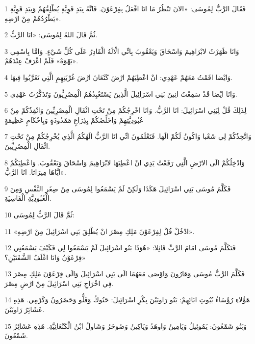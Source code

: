 \par 1 فَقَالَ الرَّبُّ لِمُوسَى: «الانَ تَنْظُرُ مَا انَا افْعَلُ بِفِرْعَوْنَ. فَانَّهُ بِيَدٍ قَوِيَّةٍ يُطْلِقُهُمْ وَبِيَدٍ قَوِيَّةٍ يَطْرُدُهُمْ مِنْ ارْضِهِ».
\par 2 ثُمَّ قَالَ اللهُ لِمُوسَى: «انَا الرَّبُّ.
\par 3 وَانَا ظَهَرْتُ لابْرَاهِيمَ وَاسْحَاقَ وَيَعْقُوبَ بِانِّي الْالَهُ الْقَادِرُ عَلَى كُلِّ شَيْءٍ. وَامَّا بِاسْمِي «يَهْوَهْ» فَلَمْ اعْرَفْ عِنْدَهُمْ.
\par 4 وَايْضا اقَمْتُ مَعَهُمْ عَهْدِي: انْ اعْطِيَهُمْ ارْضَ كَنْعَانَ ارْضَ غُرْبَتِهِمِ الَّتِي تَغَرَّبُوا فِيهَا.
\par 5 وَانَا ايْضا قَدْ سَمِعْتُ انِينَ بَنِي اسْرَائِيلَ الَّذِينَ يَسْتَعْبِدُهُمُ الْمِصْرِيُّونَ وَتَذَكَّرْتُ عَهْدِي.
\par 6 لِذَلِكَ قُلْ لِبَنِي اسْرَائِيلَ: انَا الرَّبُّ. وَانَا اخْرِجُكُمْ مِنْ تَحْتِ اثْقَالِ الْمِصْرِيِّينَ وَانْقِذُكُمْ مِنْ عُبُودِيَّتِهِمْ وَاخَلِّصُكُمْ بِذِرَاعٍ مَمْدُودَةٍ وَبِاحْكَامٍ عَظِيمَةٍ
\par 7 وَاتَّخِذُكُمْ لِي شَعْبا وَاكُونُ لَكُمْ الَها. فَتَعْلَمُونَ انِّي انَا الرَّبُّ الَهُكُمُ الَّذِي يُخْرِجُكُمْ مِنْ تَحْتِ اثْقَالِ الْمِصْرِيِّينَ.
\par 8 وَادْخِلُكُمْ الَى الارْضِ الَّتِي رَفَعْتُ يَدِي انْ اعْطِيَهَا لابْرَاهِيمَ وَاسْحَاقَ وَيَعْقُوبَ. وَاعْطِيَكُمْ ايَّاهَا مِيرَاثا. انَا الرَّبُّ».
\par 9 فَكَلَّمَ مُوسَى بَنِي اسْرَائِيلَ هَكَذَا وَلَكِنْ لَمْ يَسْمَعُوا لِمُوسَى مِنْ صِغَرِ النَّفْسِ وَمِنَ الْعُبُودِيَّةِ الْقَاسِيَةِ.
\par 10 ثُمَّ قَالَ الرَّبُّ لِمُوسَى:
\par 11 «ادْخُلْ قُلْ لِفِرْعَوْنَ مَلِكِ مِصْرَ انْ يُطْلِقَ بَنِي اسْرَائِيلَ مِنْ ارْضِهِ».
\par 12 فَتَكَلَّمَ مُوسَى امَامَ الرَّبِّ قَائِلا: «هُوَذَا بَنُو اسْرَائِيلَ لَمْ يَسْمَعُوا لِي فَكَيْفَ يَسْمَعُنِي فِرْعَوْنُ وَانَا اغْلَفُ الشَّفَتَيْنِ؟»
\par 13 فَكَلَّمَ الرَّبُّ مُوسَى وَهَارُونَ وَاوْصَى مَعَهُمَا الَى بَنِي اسْرَائِيلَ وَالَى فِرْعَوْنَ مَلِكِ مِصْرَ فِي اخْرَاجِ بَنِي اسْرَائِيلَ مِنْ ارْضِ مِصْرَ.
\par 14 هَؤُلاءِ رُؤَسَاءُ بُيُوتِ ابَائِهِمْ: بَنُو رَاوبَيْنَ بِكْرِ اسْرَائِيلَ: حَنُوكُ وَفَلُّو وَحَصْرُونُ وَكَرْمِي. هَذِهِ عَشَائِرُ رَاوبَيْنَ.
\par 15 وَبَنُو شَمْعُونَ: يَمُوئِيلُ وَيَامِينُ وَاوهَدُ وَيَاكِينُ وَصُوحَرُ وَشَاولُ ابْنُ الْكَنْعَانِيَّةِ. هَذِهِ عَشَائِرُ شَمْعُونَ.
